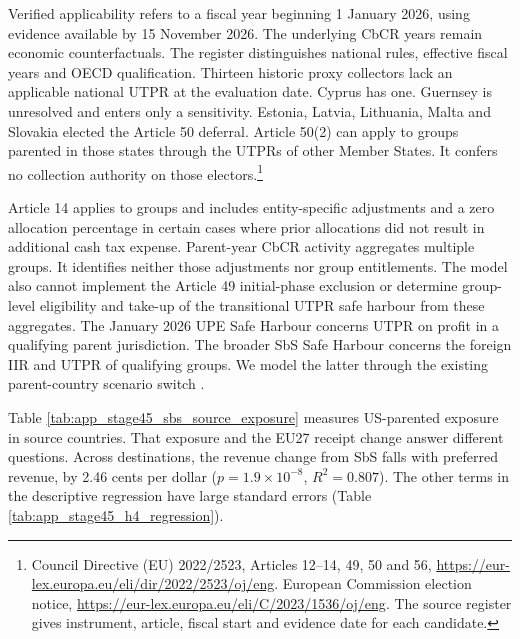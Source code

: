 \documentclass[11pt,a4paper]{article}
\begin{document}
Verified applicability refers to a fiscal year beginning 1 January 2026, using evidence available by 15 November 2026. The underlying CbCR years remain economic counterfactuals. The register distinguishes national rules, effective fiscal years and OECD qualification. Thirteen historic proxy collectors lack an applicable national UTPR at the evaluation date. Cyprus has one. Guernsey is unresolved and enters only a sensitivity. Estonia, Latvia, Lithuania, Malta and Slovakia elected the Article 50 deferral. Article 50(2) can apply to groups parented in those states through the UTPRs of other Member States. It confers no collection authority on those electors.\footnote{Council Directive (EU) 2022/2523, Articles 12–14, 49, 50 and 56, \url{https://eur-lex.europa.eu/eli/dir/2022/2523/oj/eng}. European Commission election notice, \url{https://eur-lex.europa.eu/eli/C/2023/1536/oj/eng}. The source register gives instrument, article, fiscal start and evidence date for each candidate.}

Article 14 applies to groups and includes entity-specific adjustments and a zero allocation percentage in certain cases where prior allocations did not result in additional cash tax expense. Parent-year CbCR activity aggregates multiple groups. It identifies neither those adjustments nor group entitlements. The model also cannot implement the Article 49 initial-phase exclusion or determine group-level eligibility and take-up of the transitional UTPR safe harbour from these aggregates. The January 2026 UPE Safe Harbour concerns UTPR on profit in a qualifying parent jurisdiction. The broader SbS Safe Harbour concerns the foreign IIR and UTPR of qualifying groups. We model the latter through the existing parent-country scenario switch \citep{oecd2026}.




Table \ref{tab:app_stage45_sbs_source_exposure} measures US-parented exposure in source countries. That exposure and the EU27 receipt change answer different questions. Across destinations, the revenue change from SbS falls with preferred revenue, by 2.46 cents per dollar ($p=1.9\times10^{-8}$, $R^2=0.807$). The other terms in the descriptive regression have large standard errors (Table \ref{tab:app_stage45_h4_regression}).


\end{document}
